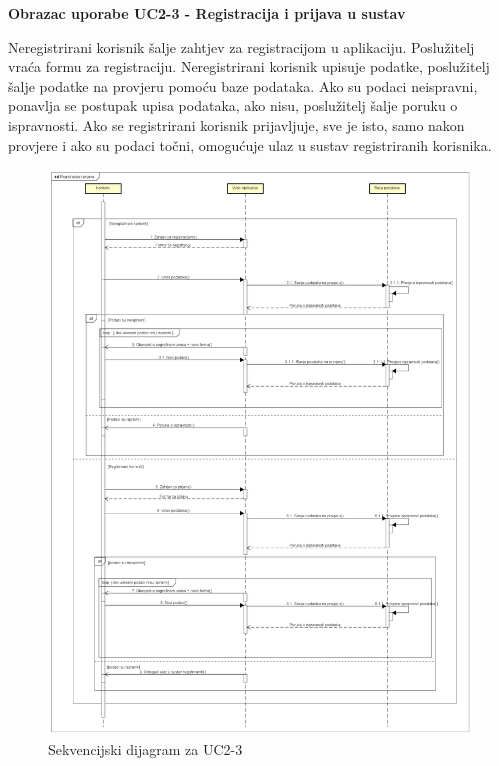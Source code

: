 \eject	

\textbf{Obrazac uporabe UC2-3 - Registracija i prijava u sustav}

Neregistrirani korisnik šalje zahtjev za registracijom u aplikaciju. Poslužitelj vraća formu za registraciju. Neregistrirani korisnik upisuje podatke, poslužitelj šalje podatke na provjeru pomoću baze podataka. Ako su podaci neispravni, ponavlja se postupak upisa podataka, ako nisu, poslužitelj šalje poruku o ispravnosti. Ako se registrirani korisnik prijavljuje, sve je isto, samo nakon provjere i ako su podaci točni, omogućuje ulaz u sustav registriranih korisnika.

\begin{figure}[H]
	\includegraphics[scale=0.3]{slike/registracijaIPrijava.png} %
	\centering
	\caption{Sekvencijski dijagram za UC2-3}
	\label{fig:Sekvencijski dijagam za UC2-3}
\end{figure}

